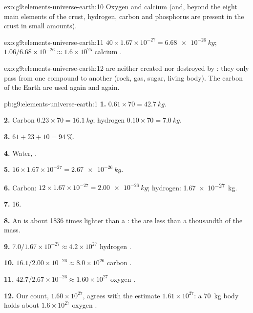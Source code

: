 \begin{solution}{exo:g9:elements-universe-earth:10}
Oxygen and calcium (and, beyond the eight main elements of the crust,
hydrogen, carbon and phosphorus are present in the crust in small
amounts).
\end{solution}

\begin{solution}{exo:g9:elements-universe-earth:11}
$40 \times 1.67 \times 10^{-27} = \qty{6.68e-26}{kg}$;
$1.06 / 6.68 \times 10^{-26} \approx 1.6 \times 10^{25}$ calcium .
\end{solution}

\begin{solution}{exo:g9:elements-universe-earth:12}
 are neither created nor destroyed by : they only
pass from one compound to another (rock, gas, sugar, living body). The
carbon  of the Earth are used again and again.
\end{solution}

\begin{solution}{pb:g9:elements-universe-earth:1}
\textbf{1.} $0.61 \times 70 = \qty{42.7}{kg}$.

\textbf{2.} Carbon $0.23 \times 70 = \qty{16.1}{kg}$; hydrogen
$0.10 \times 70 = \qty{7.0}{kg}$.

\textbf{3.} $61 + 23 + 10 = \qty{94}{\percent}$.

\textbf{4.} Water, .

\textbf{5.} $16 \times 1.67 \times 10^{-27} = \qty{2.67e-26}{kg}$.

\textbf{6.} Carbon: $12 \times 1.67 \times 10^{-27} = \qty{2.00e-26}{kg}$;
hydrogen: \qty{1.67e-27}{kg}.

\textbf{7.} 16.

\textbf{8.} An  is about 1836 times lighter than a : the
 are less than a thousandth of the mass.

\textbf{9.} $7.0 / 1.67 \times 10^{-27} \approx 4.2 \times 10^{27}$
hydrogen .

\textbf{10.} $16.1 / 2.00 \times 10^{-26} \approx 8.0 \times 10^{26}$
carbon .

\textbf{11.} $42.7 / 2.67 \times 10^{-26} \approx 1.60 \times 10^{27}$
oxygen .

\textbf{12.} Our count, $1.60 \times 10^{27}$, agrees with the estimate
$1.61 \times 10^{27}$: a \qty{70}{kg} body holds about $1.6 \times
10^{27}$ oxygen .
\end{solution}
